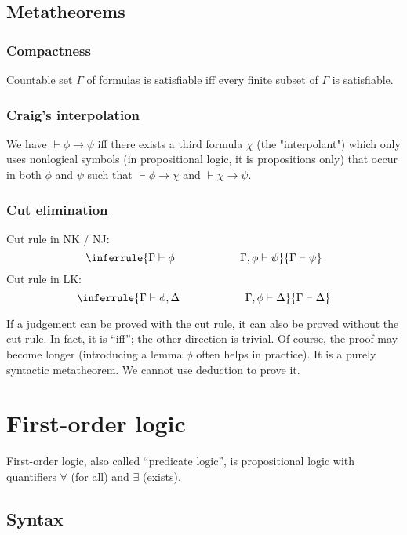 {{\subsection{Metatheorems}

\subsubsection{Compactness}

Countable set $\Gamma$ of formulas is satisfiable iff every finite subset of $\Gamma$ is satisfiable.

\subsubsection{Craig's interpolation}

We have $\vdash \phi \rightarrow \psi$ iff there exists a third formula $\chi$ (the "interpolant") which only uses
nonlogical symbols (in propositional logic, it is propositions only) that occur in
both $\phi$ and $\psi$ such that $\vdash \phi \rightarrow \chi$ and $\vdash \chi \rightarrow \psi$.

\subsubsection{Cut elimination}

Cut rule in NK / NJ:
$$\inferrule
{\Gamma\vdash\phi\qquad\qquad\qquad\Gamma,\phi\vdash\psi}
{\Gamma\vdash\psi}
$$
Cut rule in LK:
$$\inferrule
{\Gamma\vdash\phi,\Delta\qquad\qquad\qquad\Gamma,\phi\vdash\Delta}
{\Gamma\vdash\Delta}
$$

If a judgement can be proved with the cut rule, it can also be proved without the cut rule.
In fact, it is ``iff''; the other direction is trivial.
Of course, the proof may become longer (introducing a lemma $\phi$ often helps in practice).
It is a purely syntactic metatheorem. We cannot use deduction to prove it.

\section{First-order logic}

First-order logic, also called ``predicate logic'', is propositional logic with quantifiers $\forall$ (for all) and $\exists$ (exists).

\subsection{Syntax}

}}
